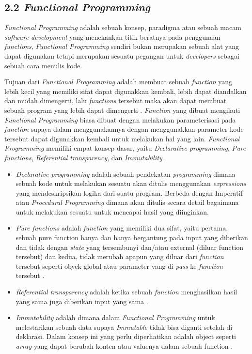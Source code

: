 \documentclass[a4paper]{article}
\begin{document}
\subsection*{2.2 \textit{Functional Programming}}
\textit{Functional Programming} adalah sebuah konsep, paradigma atau sebuah macam \textit{software development} yang menekankan titik beratnya pada penggunaan \textit{functions}, \textit{Functional Programming} sendiri bukan merupakan sebuah alat yang dapat digunakan tetapi merupakan sesuatu pegangan untuk \textit{developers} sebagai sebuah cara menulis kode\autocite{atencio2016functional}.


Tujuan dari \textit{Functional Programming} adalah membuat sebuah \textit{function} yang lebih kecil yang memiliki sifat dapat digunakkan kembali, lebih dapat diandalkan dan mudah dimengerti, lalu \textit{functions} tersebut maka akan dapat membuat sebuah program yang lebih dapat dimengerti \autocite{atencio2016functional}. \textit{Function} yang dibuat mengikuti \textit{Functional Programming} biasa dibuat dengan melakukan parameterisasi pada \textit{function} supaya dalam menggunakannya dengan menggunakkan parameter kode tersebut dapat digunakkan kembali untuk melakukan hal yang lain. \textit{Functional Programming} memiliki empat konsep dasar, yaitu \textit{Declarative programming}, \textit{Pure functions}, \textit{Referential transparency}, dan \textit{Immutability}\autocite{atencio2016functional}.


\begin{itemize}
    \item \textit{Declarative programming} adalah sebuah pendekatan \textit{programming} dimana sebuah kode untuk melakukan sesuatu akan ditulis menggunakan \textit{expressions} yang mendeskripsikan logika dari suatu program. Berbeda dengan Imperatif atau \textit{Procedural Programming} dimana akan ditulis secara detail bagaimana untuk melakukan sesuatu untuk mencapai hasil yang diinginkan\autocite{atencio2016functional}.
    \item \textit{Pure functions} adalah \textit{function} yang memiliki dua sifat, yaitu pertama, sebuah pure function hanya dan hanya bergantung pada input yang diberikan dan tidak dengan \textit{state} yang tersembunyi dan/atau external (diluar function tersebut) dan kedua, tidak merubah apapun yang diluar dari \textit{function} tersebut seperti obyek global atau parameter yang di \textit{pass} ke \textit{function} tersebut \autocite{atencio2016functional}.
    \item \textit{Referential transparency} adalah ketika sebuah \textit{function} menghasilkan hasil yang sama juga diberikan input yang sama \autocite{atencio2016functional}.
    \item \textit{Immutability} adalah dimana dalam \textit{Functional Programming} untuk melestarikan sebuah data supaya \textit{Immutable} tidak bisa diganti setelah di deklarasi. Dalam konsep ini yang perlu diperhatikan adalah object seperti \textit{array} yang dapat berubah konten atau valuenya dalam sebuah function \autocite{atencio2016functional}.
\end{itemize}
\end{document}
